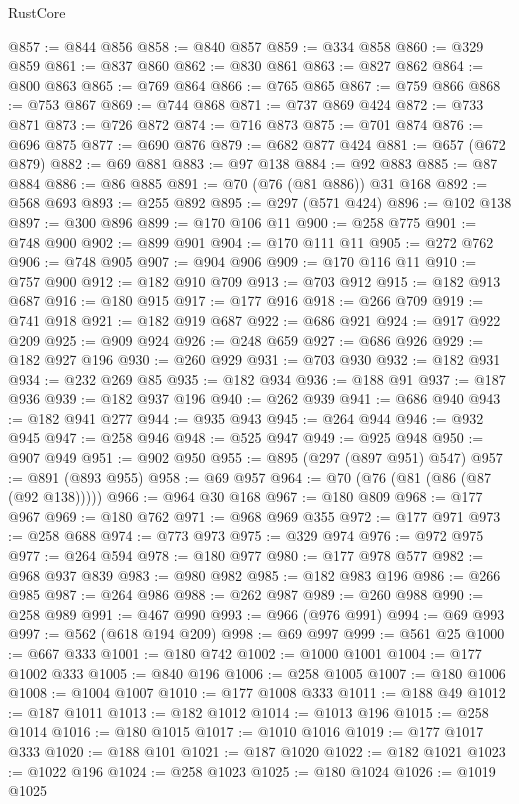 \begin{lexlean}{RustCore}
\begin{coremodule}
@857 := @844 @856
@858 := @840 @857
@859 := @334 @858
@860 := @329 @859
@861 := @837 @860
@862 := @830 @861
@863 := @827 @862
@864 := @800 @863
@865 := @769 @864
@866 := @765 @865
@867 := @759 @866
@868 := @753 @867
@869 := @744 @868
@871 := @737 @869 @424
@872 := @733 @871
@873 := @726 @872
@874 := @716 @873
@875 := @701 @874
@876 := @696 @875
@877 := @690 @876
@879 := @682 @877 @424
@881 := @657 (@672 @879)
@882 := @69 @881
@883 := @97 @138
@884 := @92 @883
@885 := @87 @884
@886 := @86 @885
@891 := @70 (@76 (@81 @886)) @31 @168
@892 := @568 @693
@893 := @255 @892
@895 := @297 (@571 @424)
@896 := @102 @138
@897 := @300 @896
@899 := @170 @106 @11
@900 := @258 @775
@901 := @748 @900
@902 := @899 @901
@904 := @170 @111 @11
@905 := @272 @762
@906 := @748 @905
@907 := @904 @906
@909 := @170 @116 @11
@910 := @757 @900
@912 := @182 @910 @709
@913 := @703 @912
@915 := @182 @913 @687
@916 := @180 @915
@917 := @177 @916
@918 := @266 @709
@919 := @741 @918
@921 := @182 @919 @687
@922 := @686 @921
@924 := @917 @922 @209
@925 := @909 @924
@926 := @248 @659
@927 := @686 @926
@929 := @182 @927 @196
@930 := @260 @929
@931 := @703 @930
@932 := @182 @931
@934 := @232 @269 @85
@935 := @182 @934
@936 := @188 @91
@937 := @187 @936
@939 := @182 @937 @196
@940 := @262 @939
@941 := @686 @940
@943 := @182 @941 @277
@944 := @935 @943
@945 := @264 @944
@946 := @932 @945
@947 := @258 @946
@948 := @525 @947
@949 := @925 @948
@950 := @907 @949
@951 := @902 @950
@955 := @895 (@297 (@897 @951) @547)
@957 := @891 (@893 @955)
@958 := @69 @957
@964 := @70 (@76 (@81 (@86 (@87 (@92 @138)))))
@966 := @964 @30 @168
@967 := @180 @809
@968 := @177 @967
@969 := @180 @762
@971 := @968 @969 @355
@972 := @177 @971
@973 := @258 @688
@974 := @773 @973
@975 := @329 @974
@976 := @972 @975
@977 := @264 @594
@978 := @180 @977
@980 := @177 @978 @577
@982 := @968 @937 @839
@983 := @980 @982
@985 := @182 @983 @196
@986 := @266 @985
@987 := @264 @986
@988 := @262 @987
@989 := @260 @988
@990 := @258 @989
@991 := @467 @990
@993 := @966 (@976 @991)
@994 := @69 @993
@997 := @562 (@618 @194 @209)
@998 := @69 @997
@999 := @561 @25
@1000 := @667 @333
@1001 := @180 @742
@1002 := @1000 @1001
@1004 := @177 @1002 @333
@1005 := @840 @196
@1006 := @258 @1005
@1007 := @180 @1006
@1008 := @1004 @1007
@1010 := @177 @1008 @333
@1011 := @188 @49
@1012 := @187 @1011
@1013 := @182 @1012
@1014 := @1013 @196
@1015 := @258 @1014
@1016 := @180 @1015
@1017 := @1010 @1016
@1019 := @177 @1017 @333
@1020 := @188 @101
@1021 := @187 @1020
@1022 := @182 @1021
@1023 := @1022 @196
@1024 := @258 @1023
@1025 := @180 @1024
@1026 := @1019 @1025

\end{coremodule}
\end{lexlean}
